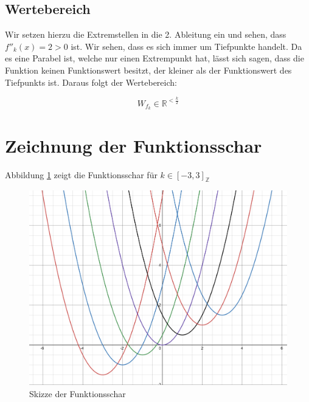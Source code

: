 \documentclass[12pt,a4paper]{article}
\begin{document}
\subsection {Wertebereich}

Wir setzen hierzu die Extremstellen in die 2. Ableitung ein und sehen, dass $f''_k(x) = 2 > 0$ ist. Wir sehen, dass es sich immer um Tiefpunkte handelt. Da es eine Parabel ist, welche nur einen Extrempunkt hat, lässt sich sagen, dass die Funktion keinen Funktionswert besitzt, der kleiner als der Funktionswert des Tiefpunkts ist. Daraus folgt der Wertebereich:

$$
W_{f_k} \in \mathbb{R}^{<\frac{k}{2}} 
$$

\section{Zeichnung der Funktionsschar}

Abbildung \ref{fig:draw} zeigt die Funktionsschar für  $k \in [-3, 3]_{\mathbb{Z}}$

\begin{figure}[h]
    \centering
    \includegraphics[width=1\textwidth]{./images/IMG_1615.jpg}
    \caption{Skizze der Funktionsschar}
    \label{fig:draw}
\end{figure}


\printbibliography[title={Literaturverzeichnis}]
\end{document}
